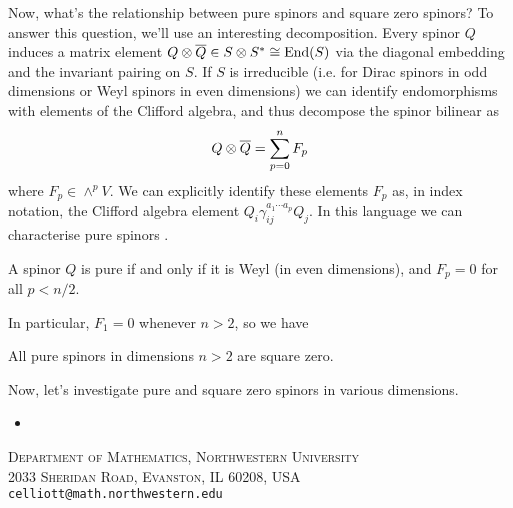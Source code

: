\documentclass[10pt, oneside]{article}
\begin{document}
Now, what's the relationship between pure spinors and square zero spinors?  To answer this question, we'll use an interesting decomposition.  Every spinor $Q$ induces a matrix element $Q \otimes \overline{Q} \in S \otimes S^* \cong \operatorname{End}(S)$ via the diagonal embedding and the invariant pairing on $S$.  If $S$ is irreducible (i.e. for Dirac spinors in odd dimensions or Weyl spinors in even dimensions) we can identify endomorphisms with elements of the Clifford algebra, and thus decompose the spinor bilinear as
\[Q \otimes \overline{Q} = \sum_{p=0}^n F_p\]
where $F_p \in \wedge^p V$.  We can explicitly identify these elements $F_p$ as, in index notation, the Clifford algebra element $Q_i \gamma^{a_1 \cdots a_p}_{ij} Q_j$.  In this language we can characterise pure spinors \cite{Chevalley}.
\begin{theorem}[Chevalley]
A spinor $Q$ is pure if and only if it is Weyl (in even dimensions), and $F_p = 0$ for all $p < n/2$. 
\end{theorem}

In particular, $F_1 = 0$ whenever $n > 2$, so we have
\begin{corollary}
All pure spinors in dimensions $n > 2$ are square zero.
\end{corollary}

Now, let's investigate pure and square zero spinors in various dimensions.
\vspace{-6pt}
\begin{itemize}
 \item 
\end{itemize}







\textsc{Department of Mathematics, Northwestern University}\\
\textsc{2033 Sheridan Road, Evanston, IL 60208, USA} \\
\texttt{celliott@math.northwestern.edu}
\end{document}
